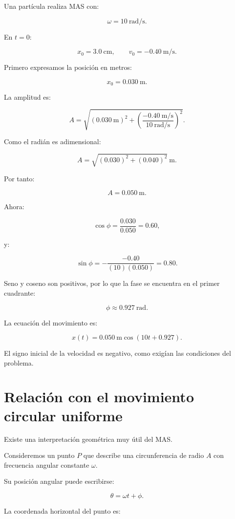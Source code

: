 \begin{ejemplo}
Una partícula realiza MAS con:

\[ \omega=\SI{10}{\radian\per\second}. \]

En \(t=0\):

\[
x_0=\SI{3.0}{\centi\meter},
\qquad
v_0=-\SI{0.40}{\meter\per\second}.
\]

Primero expresamos la posición en metros:

\[ x_0=\SI{0.030}{\meter}. \]

La amplitud es:

\[
A
=
\sqrt{
(\SI{0.030}{\meter})^2
+
\left(
\frac{-\SI{0.40}{\meter\per\second}}
{\SI{10}{\radian\per\second}}
\right)^2
}.
\]

Como el radián es adimensional:

\[
A
=
\sqrt{
(0.030)^2+(0.040)^2
}\ \si{\meter}.
\]

Por tanto:

\[ \boxed{A=\SI{0.050}{\meter}}. \]

Ahora:

\[ \cos\phi=\frac{0.030}{0.050}=0.60, \]

y:

\[
\sin\phi
=
-\frac{-0.40}{(10)(0.050)}
=
0.80.
\]

Seno y coseno son positivos, por lo que la fase se encuentra en el primer cuadrante:

\[ \phi\approx\SI{0.927}{\radian}. \]

La ecuación del movimiento es:

\[ \boxed{x(t)=\SI{0.050}{\meter}\cos(10t+0.927)}. \]

El signo inicial de la velocidad es negativo, como exigían las condiciones del problema.
\end{ejemplo}

\section{Relación con el movimiento circular uniforme}

Existe una interpretación geométrica muy útil del MAS.

Consideremos un punto \(P\) que describe una circunferencia de radio \(A\) con frecuencia angular constante \(\omega\).

Su posición angular puede escribirse:

\[ \theta=\omega t+\phi. \]

La coordenada horizontal del punto es:


